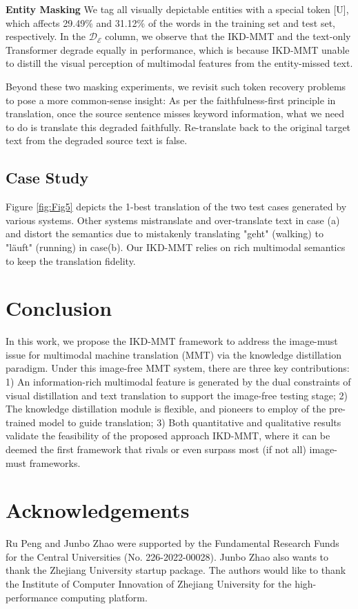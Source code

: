 \documentclass[11pt]{article}
\begin{document}
\textbf{Entity Masking}
We tag all visually depictable entities \cite{plummer2015flickr30k} with a special token [U], which affects 29.49\% and 31.12\% of the words in the training set and test set, respectively.
In the $\mathcal{D{_E}}$ column, we observe that the IKD-MMT and the text-only Transformer degrade equally in performance, which is because IKD-MMT unable to distill the visual perception of multimodal features from the entity-missed text.

Beyond these two masking experiments, we revisit such token recovery problems to pose a more common-sense insight:
As per the faithfulness-first principle \cite{koehn2009statistical} in translation, once the source sentence misses keyword information, what we need to do is translate this degraded faithfully. Re-translate back to the original target text from the degraded source text is false.

\subsection{Case Study}
Figure \ref{fig:Fig5} depicts the 1-best translation of the two test cases generated by various systems.
Other systems mistranslate and over-translate text in case (a) and distort the semantics due to mistakenly translating "geht" (walking) to "läuft" (running) in case(b).
Our IKD-MMT relies on rich multimodal semantics to keep the translation fidelity.

\section{Conclusion}
In this work, we propose the IKD-MMT framework to address the image-must issue for multimodal machine translation (MMT) via the knowledge distillation paradigm.
Under this image-free MMT system, there are three key contributions:
1) An information-rich multimodal feature is generated by the dual constraints of visual distillation and text translation to support the image-free testing stage;
2) The knowledge distillation module is flexible, and pioneers to employ of the pre-trained model to guide translation;
3) Both quantitative and qualitative results validate the feasibility of the proposed approach IKD-MMT, where it can be deemed the first framework that rivals or even surpass most (if not all) image-must frameworks.

\section*{Acknowledgements}
Ru Peng and Junbo Zhao were supported by the Fundamental Research Funds for the Central Universities (No. 226-2022-00028).
Junbo Zhao also wants to thank the Zhejiang University startup package.
The authors would like to thank the Institute of Computer Innovation of Zhejiang University for the high-performance computing platform.
\end{document}

